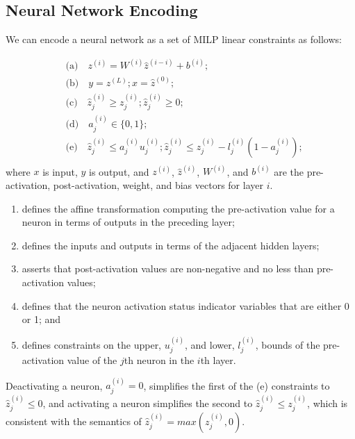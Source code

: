 \documentclass[oneside,11pt,dvipsnames]{book}
\numberwithin{equation}{section}
\theoremstyle{definition}
\theoremstyle{remark}
\begin{document}
\subsection{Neural Network Encoding} We can encode a neural network as a set of MILP linear constraints as follows:

\begin{equation}\label{eq:mip}
    \begin{aligned}
        &\text{(a)}\quad z^{(i)} = W^{(i)} \hat{z}^{(i-i)} + b^{(i)}; \\
        &\text{(b)}\quad y = z^{(L)};  x = \hat{z}^{(0)}; \\
        &\text{(c)}\quad \hat{z}_j^{(i)} \ge {z}_j^{(i)}; \hat{z}_j^{(i)} \ge 0; \\
        &\text{(d)}\quad a_j^{(i)} \in \{ 0, 1\} ;\\
        &\text{(e)}\quad \hat{z}_j^{(i)} \le {a}_j^{(i)} {u}_j^{(i)}; \hat{z}_j^{(i)} \le {z}_j^{(i)} - {l}_j^{(i)}(1 - {a}_j^{(i)}); \\
    \end{aligned}
\end{equation}
where $x$ is input, $y$ is output, and $z^{(i)}$, $\hat{z}^{(i)}$, $W^{(i)}$, and $b^{(i)}$ are the pre-activation, post-activation, weight, and bias vectors for layer $i$.
\begin{enumerate}[label=(\alph*)]
    \item defines the affine transformation computing the pre-activation value for a neuron in terms of outputs in the preceding layer;
    \item defines the inputs and outputs in terms of the adjacent hidden layers;
    \item asserts that post-activation values are non-negative and no less than pre-activation values;
    \item defines that the neuron activation status indicator variables that are either 0 or 1; and
    \item defines constraints on the upper, $u_j^{(i)}$, and lower, $l_j^{(i)}$, bounds of the pre-activation value of the $j$th neuron in the $i$th layer.
\end{enumerate}
Deactivating a neuron, $a_j^{(i)} = 0$, simplifies the first of the (e) constraints to $\hat{z}_j^{(i)} \le 0$, and activating a neuron simplifies the second to $\hat{z}_j^{(i)} \le z_j^{(i)}$, which is consistent with the semantics of $\hat{z}_j^{(i)} = max(z_j^{(i)},0)$.
\end{document}
